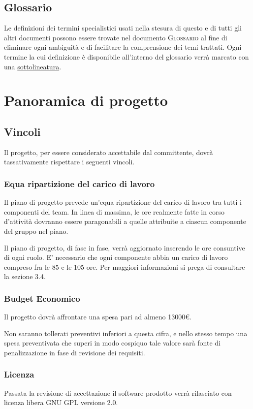 \documentclass[11pt,a4paper]{article}
\begin{document}
\subsection{Glossario} 
Le definizioni dei termini specialistici usati nella stesura di questo e di tutti gli altri documenti possono essere trovate nel documento \textsc{Glossario} al fine di eliminare ogni ambiguità e di facilitare la comprensione dei temi trattati. Ogni termine la cui definizione è disponibile all'interno del glossario verrà marcato con una \underline{sottolineatura}.
\section{Panoramica di progetto}
\subsection{Vincoli}
Il progetto, per essere considerato accettabile dal committente, dovrà tassativamente rispettare i seguenti vincoli.
\subsubsection{Equa ripartizione del carico di lavoro}
Il piano di progetto prevede un'equa ripartizione del carico di lavoro tra tutti i componenti del team.
In linea di massima, le ore realmente fatte in corso d'attività dovranno essere paragonabili a quelle attribuite a ciascun componente del gruppo nel piano.

Il piano di progetto, di fase in fase, verrà aggiornato inserendo le ore consuntive di ogni ruolo.
E' necessario che ogni componente abbia un carico di lavoro compreso fra le 85 e le 105 ore. Per maggiori informazioni si prega di consultare la sezione 3.4.
\subsubsection{Budget Economico}
Il progetto dovrà affrontare una spesa pari ad almeno 13000\euro.

Non saranno tollerati preventivi inferiori a questa cifra, e nello stesso tempo una spesa preventivata che superi in modo cospiquo tale valore sarà fonte di penalizzazione in fase di revisione dei requisiti.
\subsubsection{Licenza}
Passata la revisione di accettazione il software prodotto verrà rilasciato con licenza libera GNU GPL versione 2.0.
\end{document}

